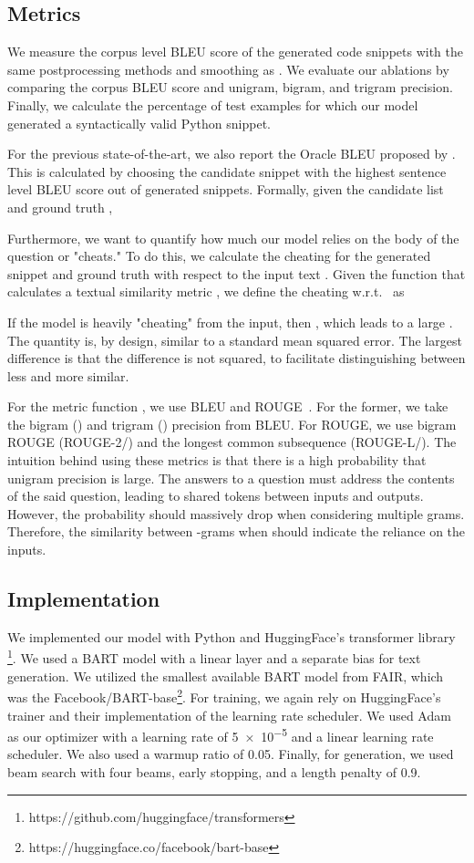 \documentclass[11pt]{article}
\begin{document}
\subsection{Metrics}\label{subsec:metrics}
We measure the corpus level BLEU score of the generated code snippets with the same postprocessing methods and smoothing as \citet{xu-etal-2020-incorporating}. We evaluate our ablations by comparing the corpus BLEU score and unigram, bigram, and trigram precision. Finally, we calculate the percentage of test examples for which our model generated a syntactically valid Python snippet.   

\indent For the previous state-of-the-art, we also report the Oracle BLEU proposed by \citet{yin-neubig-2019-reranking}. This is calculated by choosing the candidate snippet  with the highest sentence level BLEU score out of  generated snippets. Formally, given the candidate list  and ground truth , 
 

\indent Furthermore, we want to quantify how much our model relies on the body of the question or "cheats." To do this, we calculate the cheating for the generated snippet  and ground truth  with respect to the input text . Given the function  that calculates a textual similarity metric , we define the cheating w.r.t.~ as


If the model is heavily "cheating" from the input, then , which leads to a large . The quantity  is, by design, similar to a standard mean squared error. The largest difference is that the difference is not squared, to facilitate distinguishing between less and more similar.

\indent For the metric function , we use BLEU and ROUGE~\citep{lin-2004-rouge}. For the former, we take the bigram () and trigram () precision from BLEU. For ROUGE, we use bigram ROUGE (ROUGE-2/) and the longest common subsequence (ROUGE-L/). The intuition behind using these metrics is that there is a high probability that unigram precision is large. The answers to a question must address the contents of the said question, leading to shared tokens between inputs and outputs. However, the probability should massively drop when considering multiple grams. Therefore, the similarity between -grams when  should indicate the reliance on the inputs.

\subsection{Implementation}
We implemented our model with Python and HuggingFace's transformer library \citep{wolf-etal-2020-transformers}\footnote{https://github.com/huggingface/transformers}. We used a BART model with a linear layer and a separate bias for text generation. We utilized the smallest available BART model from FAIR, which was the Facebook/BART-base\footnote{https://huggingface.co/facebook/bart-base}. For training, we again rely on HuggingFace's trainer and their implementation of the learning rate scheduler. We used Adam~\citep{DBLP:journals/corr/abs-1711-05101} as our optimizer with a learning rate of \num{5e-5} and a linear learning rate scheduler. We also used a warmup ratio of 0.05. Finally, for generation, we used beam search with four beams, early stopping, and a length penalty of 0.9.
\end{document}
